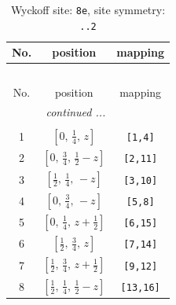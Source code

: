 \documentclass[fleqn,8pt]{jsarticle}
\begin{document}
\begin{longtable}{ccc}
\caption{Wyckoff site: {\tt 8e}, site symmetry: {\tt ..2}}
 \\
 \hline \hline
No. & position & mapping \\ \hline \endfirsthead

\multicolumn{2}{l}{\tablename\ \thetable{}} \\
 \hline \hline
No. & position & mapping \\ \hline \endhead

 \hline \hline
\multicolumn{2}{r}{\footnotesize\it continued ...} \\ \endfoot

 \hline \hline
\multicolumn{2}{r}{} \\ \endlastfoot

1 & $\left[ 0,\, \frac{1}{4},\, z \right]$ & {\tt [1,4]} \\ \hline
2 & $\left[ 0,\, \frac{3}{4},\, \frac{1}{2} - z \right]$ & {\tt [2,11]} \\ \hline
3 & $\left[ \frac{1}{2},\, \frac{1}{4},\, - z \right]$ & {\tt [3,10]} \\ \hline
4 & $\left[ 0,\, \frac{3}{4},\, - z \right]$ & {\tt [5,8]} \\ \hline
5 & $\left[ 0,\, \frac{1}{4},\, z + \frac{1}{2} \right]$ & {\tt [6,15]} \\ \hline
6 & $\left[ \frac{1}{2},\, \frac{3}{4},\, z \right]$ & {\tt [7,14]} \\ \hline
7 & $\left[ \frac{1}{2},\, \frac{3}{4},\, z + \frac{1}{2} \right]$ & {\tt [9,12]} \\ \hline
8 & $\left[ \frac{1}{2},\, \frac{1}{4},\, \frac{1}{2} - z \right]$ & {\tt [13,16]} \\
\end{longtable}
\renewcommand{\arraystretch}{1.2}
\end{document}
